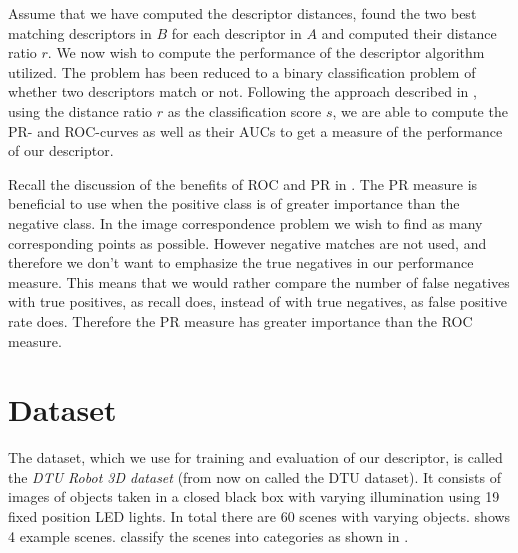 \documentclass[thesis.tex]{subfiles}
\begin{document}
Assume that we have computed the descriptor distances, found the two best matching descriptors in $B$ for each descriptor in $A$ and computed their distance ratio $r$. We now wish to compute the performance of the descriptor algorithm utilized. The problem has been reduced to a binary classification problem of whether two descriptors match or not. Following the approach described in , using the distance ratio $r$ as the classification score $s$, we are able to compute the PR- and ROC-curves as well as their AUCs to get a measure of the performance of our descriptor.

Recall the discussion of the benefits of ROC and PR in . The PR measure is beneficial to use when the positive class is of greater importance than the negative class. In the image correspondence problem we wish to find as many corresponding points as possible. However negative matches are not used, and therefore we don't want to emphasize the true negatives in our performance measure. This means that we would rather compare the number of false negatives with true positives, as recall does, instead of with true negatives, as false positive rate does. Therefore the PR measure has greater importance than the ROC measure.


\section{Dataset}
\label{sec:dtuDataset}
The dataset, which we use for training and evaluation of our descriptor, is called the \emph{DTU Robot 3D dataset} \cite{aanaes2010recall} (from now on called the DTU dataset). It consists of images of objects taken in a closed black box with varying illumination using 19 fixed position LED lights. In total there are 60 scenes with varying objects.  shows 4 example scenes. \citet{aanaes2010ground} classify the scenes into categories as shown in .
\end{document}
